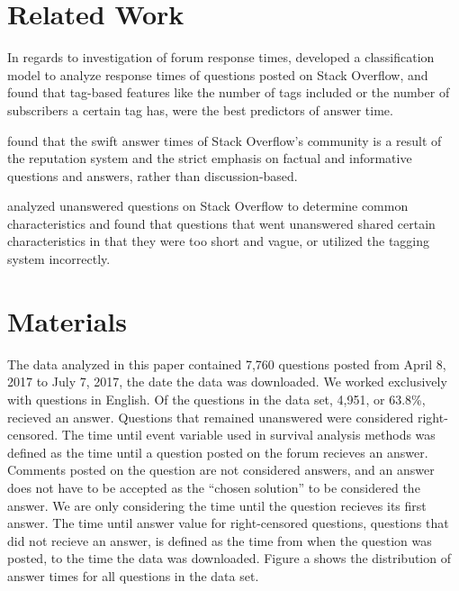 \documentclass[12pt]{article}
\begin{document}
\section{Related Work}

    In regards to investigation of forum response times, \citep{Bhat2014} developed a classification model to analyze response times of questions posted on Stack Overflow, and found that tag-based features like the number of tags included or the number of subscribers a certain tag has, were the best predictors of answer time. 

    \citep{Mamykina2011} found that the swift answer times of Stack Overflow's community is a result of the reputation system and the strict emphasis on factual and informative questions and answers, rather than discussion-based. 

    \citep{Asaduzzaman2013} analyzed unanswered questions on Stack Overflow to determine common characteristics and found that questions that went unanswered shared certain characteristics in that they were too short and vague, or utilized the tagging system incorrectly. 

\section{Materials}

    The data analyzed in this paper contained 7,760 questions posted from April 8, 2017 to July 7, 2017, the date the data was downloaded. We worked exclusively with questions in English. Of the questions in the data set, 4,951, or 63.8\%, recieved an answer. Questions that remained unanswered were considered right-censored. The time until event variable used in survival analysis methods was defined as the time until a question posted on the forum recieves an answer. Comments posted on the question are not considered answers, and an answer does not have to be accepted as the ``chosen solution'' to be considered the answer. We are only considering the time until the question recieves its first answer. The time until answer value for right-censored questions, questions that did not recieve an answer, is defined as the time from when the question was posted, to the time the data was downloaded. Figure a shows the distribution of answer times for all questions in the data set. 
    
\end{document}
